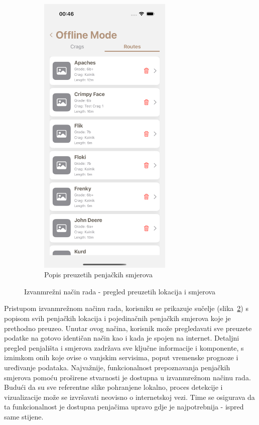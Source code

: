 \begin{figure}[H]
\begin{subfigure}[b]{0.4\textwidth}
        \includegraphics[width=0.7\textwidth]{images/implementacija/offline-mode/routes-tab.png}
        \caption{Popis preuzetih penjačkih smjerova}
        \label{fig:offline_routes_tab}
    \end{subfigure}
    \caption{Izvanmrežni način rada - pregled preuzetih lokacija i smjerova}
    \label{fig:izvanmrezni_nacin_rada}
\end{figure}

Pristupom izvanmrežnom načinu rada, korisniku se prikazuje sučelje (slika~\ref{fig:izvanmrezni_nacin_rada}) s popisom svih penjačkih lokacija i pojedinačnih penjačkih smjerova koje je prethodno preuzeo. Unutar ovog načina, korisnik može pregledavati sve preuzete podatke na gotovo identičan način kao i kada je spojen na internet. Detaljni pregled penjališta i smjerova zadržava sve ključne informacije i komponente, s iznimkom onih koje ovise o vanjskim servisima, poput vremenske prognoze i uređivanje podataka.
Najvažnije, funkcionalnost prepoznavanja penjačkih smjerova pomoću proširene stvarnosti je dostupna u izvanmrežnom načinu rada. Budući da su sve referentne slike pohranjene lokalno, proces detekcije i vizualizacije može se izvršavati neovisno o internetskoj vezi. Time se osigurava da ta funkcionalnost je dostupna penjačima upravo gdje je najpotrebnija - ispred same stijene.

